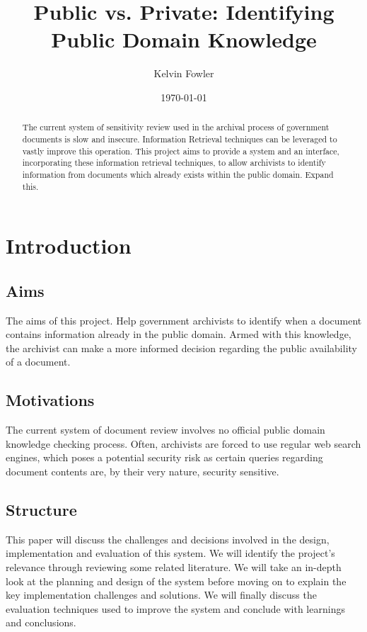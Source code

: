 \documentclass{l4proj}
\title{Public vs. Private: \newline Identifying Public Domain Knowledge}
\author{Kelvin Fowler}
\date{\today}
\begin{document}
\maketitle

\begin{abstract}
The current system of sensitivity review used in the archival process of government documents is slow and insecure. Information Retrieval techniques can be leveraged to vastly improve this operation. This project aims to provide a system and an interface, incorporating these information retrieval techniques, to allow archivists to identify information from documents which already exists within the public domain.
Expand this.
\end{abstract}


\educationalconsent

\tableofcontents

\chapter{Introduction}

\section{Aims}
The aims of this project.
Help government archivists to identify when a document contains information already in the public domain. Armed with this knowledge, the archivist can make a more informed decision regarding the public availability of a document.

\section{Motivations}
The current system of document review involves no official public domain knowledge checking process. Often, archivists are forced to use regular web search engines, which poses a potential security risk as certain queries regarding document contents are, by their very nature, security sensitive.

\section{Structure}
This paper will discuss the challenges and decisions involved in the design, implementation and evaluation of this system. We will identify the project's relevance through reviewing some related literature. We will take an in-depth look at the planning and design of the system before moving on to explain the key implementation challenges and solutions.
We will finally discuss the evaluation techniques used to improve the system and conclude with learnings and conclusions.
\end{document}
